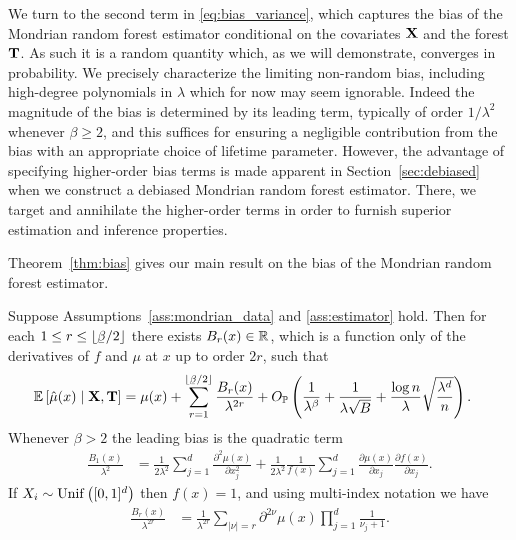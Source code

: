 We turn to the second term in \eqref{eq:bias_variance},
which captures the bias of the Mondrian random forest
estimator conditional on the covariates $\mathbf{X}$ and the forest $\mathbf{T}$.
As such it is a random quantity which,
as we will demonstrate, converges in probability.
We precisely characterize the limiting non-random bias,
including high-degree polynomials in $\lambda$ which for now
may seem ignorable.
Indeed the magnitude of the bias is determined by its leading term,
typically of order $1/\lambda^2$ whenever $\beta \geq 2$,
and this suffices for ensuring a negligible contribution from the bias
with an appropriate choice of lifetime parameter.
However, the advantage of specifying higher-order bias terms
is made apparent in Section~\ref{sec:debiased} when we construct
a debiased Mondrian random forest estimator.
There, we target and annihilate the higher-order terms in order
to furnish superior estimation and inference properties.

Theorem~\ref{thm:bias} gives our main result on
the bias of the Mondrian random forest estimator.

\begin{theorem}%
  \label{thm:bias}
  Suppose Assumptions~\ref{ass:mondrian_data} and \ref{ass:estimator} hold.
  Then for each $1 \leq r \leq \lfloor \flbeta / 2 \rfloor$ there exists
  $B_r(x) \in \mathbb{R}$, which is a function only of
  the derivatives of $f$ and $\mu$ at $x$ up to order $2r$,
  such that
  \begin{align*}
    \E \left[ \hat \mu(x) \mid \bX, \bT \right]
    &=
    \mu(x)
    + \sum_{r=1}^{\lfloor \flbeta / 2 \rfloor}
    \frac{B_r(x)}{\lambda^{2r}}
    + O_\P \left(
      \frac{1}{\lambda^\beta}
      + \frac{1}{\lambda \sqrt B}
      + \frac{\log n}{\lambda} \sqrt{\frac{\lambda^d}{n}}
    \right).
  \end{align*}
  Whenever $\beta > 2$ the leading bias is the quadratic term
  \begin{align*}
    \frac{B_1(x)}{\lambda^2}
    &=
    \frac{1}{2 \lambda^2}
    \sum_{j=1}^d \frac{\partial^2 \mu(x)}{\partial x_j^2}
    + \frac{1}{2 \lambda^2}
    \frac{1}{f(x)}
    \sum_{j=1}^{d} \frac{\partial \mu(x)}{\partial x_j}
    \frac{\partial f(x)}{\partial x_j}.
  \end{align*}
  If $X_i \sim \operatorname{Unif}\big([0,1]^d\big)$ then $f(x) = 1$,
  and using multi-index notation we have
  \begin{align*}
    \frac{B_r(x)}{\lambda^{2r}}
    &=
    \frac{1}{\lambda^{2r}}
    \sum_{|\nu|=r}
    \partial^{2 \nu} \mu(x)
    \prod_{j=1}^d
    \frac{1}{\nu_j + 1}.
  \end{align*}
\end{theorem}

